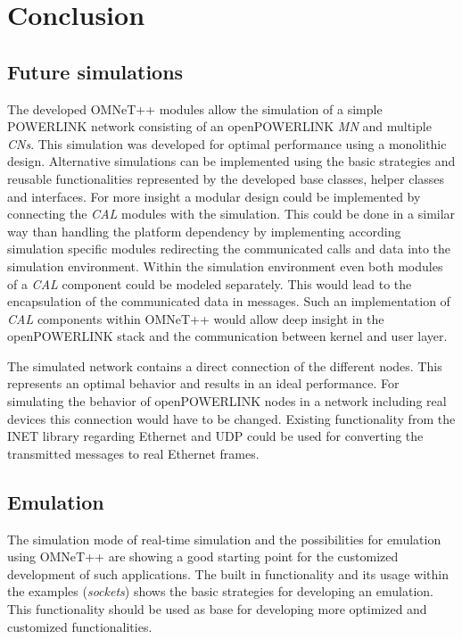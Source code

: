 \chapter{Conclusion}
\label{cha:conclusion}


\section{Future simulations}
\label{sec:conclusion_futuresim}
\begin{sloppypar}
The developed OMNeT++ modules allow the simulation of a simple \mbox{POWERLINK} network consisting of an openPOWERLINK \emph{MN} and multiple \emph{CNs}.
This simulation was developed for optimal performance using a monolithic design.
Alternative simulations can be implemented using the basic strategies and reusable functionalities represented by the developed base classes, helper classes and interfaces.
For more insight a modular design could be implemented by connecting the \emph{CAL} modules with the simulation.
This could be done in a similar way than handling the platform dependency by implementing according simulation specific modules redirecting the communicated calls and data into the simulation environment.
Within the simulation environment even both modules of a \emph{CAL} component could be modeled separately.
This would lead to the encapsulation of the communicated data in messages.
Such an implementation of \emph{CAL} components within OMNeT++ would allow deep insight in the openPOWERLINK stack and the communication between kernel and user layer.
\end{sloppypar}

The simulated network contains a direct connection of the different nodes.
This represents an optimal behavior and results in an ideal performance.
For simulating the behavior of openPOWERLINK nodes in a network including real devices this connection would have to be changed.
Existing functionality from the INET library regarding Ethernet and UDP could be used for converting the transmitted messages to real Ethernet frames.

\section{Emulation}
\label{sec:conclusion_emulation}
The simulation mode of real-time simulation and the possibilities for emulation using OMNeT++ are showing a good starting point for the customized development of such applications.
The built in functionality and its usage within the examples (\emph{sockets}) shows the basic strategies for developing an emulation.
This functionality should be used as base for developing more optimized and customized functionalities.

